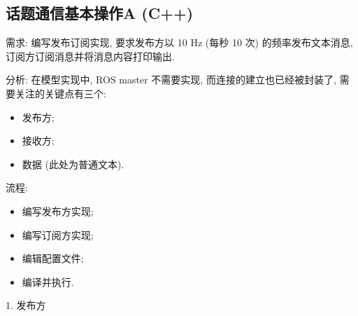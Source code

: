 \documentclass[openany, fontset=windowsold]{ctexbook}
\theoremstyle{kaiti}
\theoremstyle{normal}
\begin{document}
\subsection{话题通信基本操作A (C++)}

需求: 编写发布订阅实现, 要求发布方以 10 Hz (每秒 10 次) 的频率发布文本消息, 订阅方订阅消息并将消息内容打印输出.

分析: 在模型实现中, ROS master 不需要实现, 而连接的建立也已经被封装了, 需要关注的关键点有三个:

\begin{itemize}
  \item 发布方;
  \item 接收方;
  \item 数据 (此处为普通文本).
\end{itemize}

流程:

\begin{itemize}
  \item 编写发布方实现; 
  \item 编写订阅方实现; 
  \item 编辑配置文件; 
  \item 编译并执行.
\end{itemize}

1. 发布方
\end{document}
